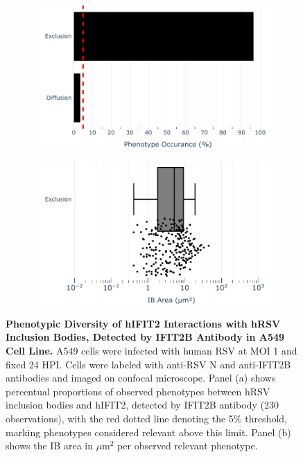 \begin{figure}
    \begin{subfigure}{0.495\textwidth}
        \caption{}
        \includegraphics[width=1\linewidth]{08. Chapter 3/Figs/02. Infection/02. IFIT2/02. IFIT2B/01. bar_i2b_a549.pdf}
    \end{subfigure}
    \begin{subfigure}{0.495\textwidth}
        \caption{}
        \includegraphics[width=1\linewidth]{08. Chapter 3/Figs/02. Infection/02. IFIT2/02. IFIT2B/02. box_i2b_a549.pdf}
    \end{subfigure}
    \caption[Phenotypic Diversity of hIFIT2 Interactions with hRSV Inclusion Bodies, Detected by IFIT2B Antibody in A549 Cell Line.]{\textbf{Phenotypic Diversity of hIFIT2 Interactions with hRSV Inclusion Bodies, Detected by IFIT2B Antibody in A549 Cell Line.} A549 cells were infected with human RSV at MOI 1 and fixed 24 HPI. Cells were labeled with anti-RSV N and anti-IFIT2B antibodies and imaged on confocal microscope. Panel (a) shows percentual proportions of observed phenotypes between hRSV inclusion bodies and hIFIT2, detected by IFIT2B antibody (230 observations), with the red dotted line denoting the 5\% threshold, marking phenotypes considered relevant above this limit. Panel (b) shows the IB area in \(\mu \mbox{m}^2\) per observed relevant phenotype.}
    \label{fig:Phenotypic Diversity of hIFIT2 Interactions with hRSV Inclusion Bodies, Detected by IFIT2B Antibody in A549 Cell Line}
\end{figure}

